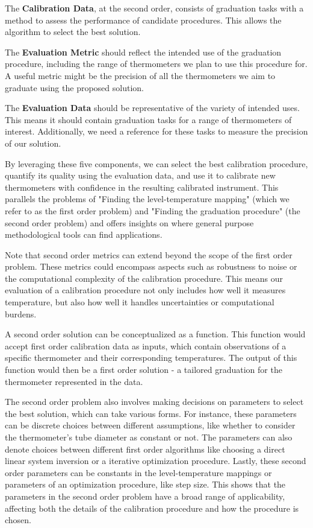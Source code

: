 \begin{bibunit}
The \textbf{Calibration Data}, at the second order, consists of graduation tasks with a method to assess the performance of candidate procedures. This allows the algorithm to select the best solution.

The \textbf{Evaluation Metric} should reflect the intended use of the graduation procedure, including the range of thermometers we plan to use this procedure for. A useful metric might be the precision of all the thermometers we aim to graduate using the proposed solution.

The \textbf{Evaluation Data} should be representative of the variety of intended uses. This means it should contain graduation tasks for a range of thermometers of interest. Additionally, we need a reference for these tasks to measure the precision of our solution.

By leveraging these five components, we can select the best calibration procedure, quantify its quality using the evaluation data, and use it to calibrate new thermometers with confidence in the resulting calibrated instrument. This parallels the problems of "Finding the level-temperature mapping" (which we refer to as the first order problem) and "Finding the graduation procedure" (the second order problem) and offers insights on where general purpose methodological tools can find applications.

Note that second order metrics can extend beyond the scope of the first order problem. These metrics could encompass aspects such as robustness to noise or the computational complexity of the calibration procedure. This means our evaluation of a calibration procedure not only includes how well it measures temperature, but also how well it handles uncertainties or computational burdens.

A second order solution can be conceptualized as a function. This function would accept first order calibration data as inputs, which contain observations of a specific thermometer and their corresponding temperatures. The output of this function would then be a first order solution - a tailored graduation for the thermometer represented in the data.

The second order problem also involves making decisions on parameters to select the best solution, which can take various forms. For instance, these parameters can be discrete choices between different assumptions, like whether to consider the thermometer's tube diameter as constant or not. The parameters can also denote choices between different first order algorithms like choosing a direct linear system inversion or a iterative optimization procedure. Lastly, these second order parameters can be constants in the level-temperature mappings or parameters of an optimization procedure, like step size. This shows that the parameters in the second order problem have a broad range of applicability, affecting both the details of the calibration procedure and how the procedure is chosen.


\end{bibunit}
